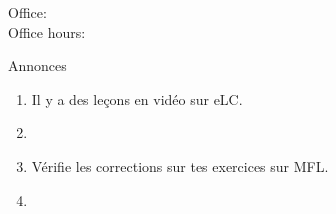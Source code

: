 \documentclass{beamer}
\subtitle[Il y a, c'est, ce sont]{Il y a, c'est, ce sont}
\begin{document}
  \begin{frame}
    \titlepage
    \tiny{Office: \\
          Office hours: }
  \end{frame}

  \begin{frame}{Annonces }
    \begin{enumerate}
      \item Il y a des leçons en vidéo sur eLC.
      \item[] 
      \item Vérifie les corrections sur tes exercices sur MFL.
      \item[] 
    \end{enumerate}
  \end{frame}

\end{document}

